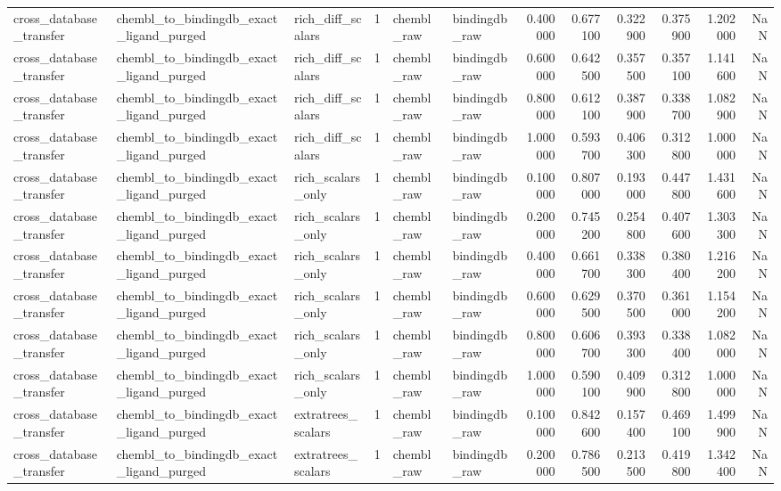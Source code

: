 \begin{longtable}{lllrllrrrrrr}
cross\_database\_transfer & chembl\_to\_bindingdb\_exact\_ligand\_purged & rich\_diff\_scalars & 1 & chembl\_raw & bindingdb\_raw & 0.400000 & 0.677100 & 0.322900 & 0.375900 & 1.202000 & NaN \\
cross\_database\_transfer & chembl\_to\_bindingdb\_exact\_ligand\_purged & rich\_diff\_scalars & 1 & chembl\_raw & bindingdb\_raw & 0.600000 & 0.642500 & 0.357500 & 0.357100 & 1.141600 & NaN \\
cross\_database\_transfer & chembl\_to\_bindingdb\_exact\_ligand\_purged & rich\_diff\_scalars & 1 & chembl\_raw & bindingdb\_raw & 0.800000 & 0.612100 & 0.387900 & 0.338700 & 1.082900 & NaN \\
cross\_database\_transfer & chembl\_to\_bindingdb\_exact\_ligand\_purged & rich\_diff\_scalars & 1 & chembl\_raw & bindingdb\_raw & 1.000000 & 0.593700 & 0.406300 & 0.312800 & 1.000000 & NaN \\
cross\_database\_transfer & chembl\_to\_bindingdb\_exact\_ligand\_purged & rich\_scalars\_only & 1 & chembl\_raw & bindingdb\_raw & 0.100000 & 0.807000 & 0.193000 & 0.447800 & 1.431600 & NaN \\
cross\_database\_transfer & chembl\_to\_bindingdb\_exact\_ligand\_purged & rich\_scalars\_only & 1 & chembl\_raw & bindingdb\_raw & 0.200000 & 0.745200 & 0.254800 & 0.407600 & 1.303300 & NaN \\
cross\_database\_transfer & chembl\_to\_bindingdb\_exact\_ligand\_purged & rich\_scalars\_only & 1 & chembl\_raw & bindingdb\_raw & 0.400000 & 0.661700 & 0.338300 & 0.380400 & 1.216200 & NaN \\
cross\_database\_transfer & chembl\_to\_bindingdb\_exact\_ligand\_purged & rich\_scalars\_only & 1 & chembl\_raw & bindingdb\_raw & 0.600000 & 0.629500 & 0.370500 & 0.361000 & 1.154200 & NaN \\
cross\_database\_transfer & chembl\_to\_bindingdb\_exact\_ligand\_purged & rich\_scalars\_only & 1 & chembl\_raw & bindingdb\_raw & 0.800000 & 0.606700 & 0.393300 & 0.338400 & 1.082000 & NaN \\
cross\_database\_transfer & chembl\_to\_bindingdb\_exact\_ligand\_purged & rich\_scalars\_only & 1 & chembl\_raw & bindingdb\_raw & 1.000000 & 0.590100 & 0.409900 & 0.312800 & 1.000000 & NaN \\
cross\_database\_transfer & chembl\_to\_bindingdb\_exact\_ligand\_purged & extratrees\_scalars & 1 & chembl\_raw & bindingdb\_raw & 0.100000 & 0.842600 & 0.157400 & 0.469100 & 1.499900 & NaN \\
cross\_database\_transfer & chembl\_to\_bindingdb\_exact\_ligand\_purged & extratrees\_scalars & 1 & chembl\_raw & bindingdb\_raw & 0.200000 & 0.786500 & 0.213500 & 0.419800 & 1.342400 & NaN \\

\end{longtable}
